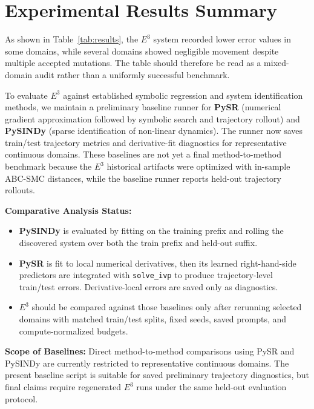 \section{Experimental Results Summary}
\label{sec:results}



As shown in Table~\ref{tab:results}, the $E^3$ system recorded lower error values in some domains, while several domains showed negligible movement despite multiple accepted mutations. The table should therefore be read as a mixed-domain audit rather than a uniformly successful benchmark.

To evaluate $E^3$ against established symbolic regression and system identification methods, we maintain a preliminary baseline runner for \textbf{PySR} (numerical gradient approximation followed by symbolic search and trajectory rollout) and \textbf{PySINDy} (sparse identification of non-linear dynamics). The runner now saves train/test trajectory metrics and derivative-fit diagnostics for representative continuous domains. These baselines are not yet a final method-to-method benchmark because the $E^3$ historical artifacts were optimized with in-sample ABC-SMC distances, while the baseline runner reports held-out trajectory rollouts.

\textbf{Comparative Analysis Status:} 
\begin{itemize}
    \item \textbf{PySINDy} is evaluated by fitting on the training prefix and rolling the discovered system over both the train prefix and held-out suffix.
    \item \textbf{PySR} is fit to local numerical derivatives, then its learned right-hand-side predictors are integrated with \texttt{solve\_ivp} to produce trajectory-level train/test errors. Derivative-local errors are saved only as diagnostics.
    \item \textbf{$E^3$} should be compared against those baselines only after rerunning selected domains with matched train/test splits, fixed seeds, saved prompts, and compute-normalized budgets.
\end{itemize}

\textbf{Scope of Baselines:} Direct method-to-method comparisons using PySR and PySINDy are currently restricted to representative continuous domains. The present baseline script is suitable for saved preliminary trajectory diagnostics, but final claims require regenerated $E^3$ runs under the same held-out evaluation protocol.

